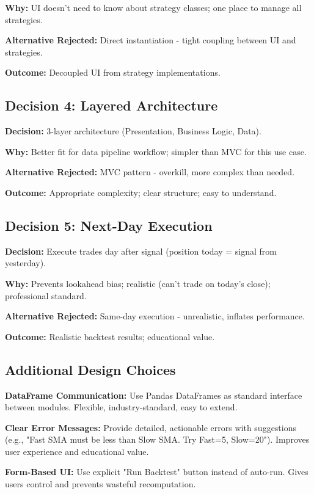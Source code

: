\documentclass[11pt,a4paper]{article}
\begin{document}
\textbf{Why:} UI doesn't need to know about strategy classes; one place to manage all strategies.

\textbf{Alternative Rejected:} Direct instantiation - tight coupling between UI and strategies.

\textbf{Outcome:} Decoupled UI from strategy implementations.

\subsection{Decision 4: Layered Architecture}
\textbf{Decision:} 3-layer architecture (Presentation, Business Logic, Data).

\textbf{Why:} Better fit for data pipeline workflow; simpler than MVC for this use case.

\textbf{Alternative Rejected:} MVC pattern - overkill, more complex than needed.

\textbf{Outcome:} Appropriate complexity; clear structure; easy to understand.

\subsection{Decision 5: Next-Day Execution}
\textbf{Decision:} Execute trades day after signal (position today = signal from yesterday).

\textbf{Why:} Prevents lookahead bias; realistic (can't trade on today's close); professional standard.

\textbf{Alternative Rejected:} Same-day execution - unrealistic, inflates performance.

\textbf{Outcome:} Realistic backtest results; educational value.

\subsection{Additional Design Choices}

\textbf{DataFrame Communication:} Use Pandas DataFrames as standard interface between modules. Flexible, industry-standard, easy to extend.

\textbf{Clear Error Messages:} Provide detailed, actionable errors with suggestions (e.g., "Fast SMA must be less than Slow SMA. Try Fast=5, Slow=20"). Improves user experience and educational value.

\textbf{Form-Based UI:} Use explicit "Run Backtest" button instead of auto-run. Gives users control and prevents wasteful recomputation.
\end{document}
